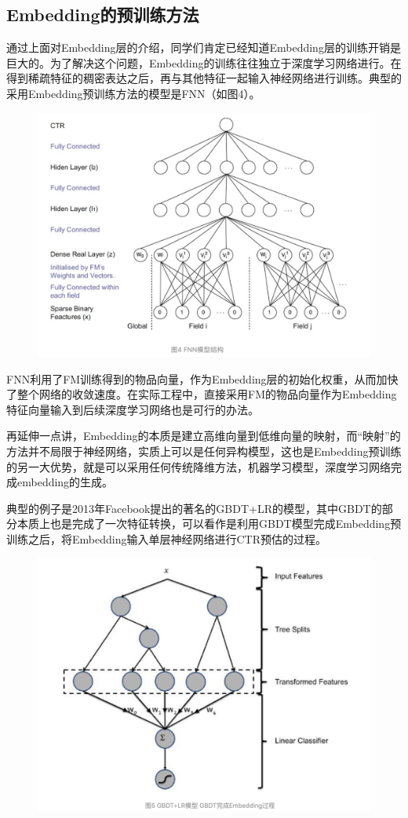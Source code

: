 \documentclass[12pt]{article}
\begin{document}
\subsection{Embedding的预训练方法}
通过上面对Embedding层的介绍，同学们肯定已经知道Embedding层的训练开销是巨大的。为了解决这个问题，Embedding的训练往往独立于深度学习网络进行。在得到稀疏特征的稠密表达之后，再与其他特征一起输入神经网络进行训练。典型的采用Embedding预训练方法的模型是FNN（如图4）。
\begin{figure}[H]
    \centering
    \includegraphics[width=.8\textwidth]{fig/FNN_Structure.png}
\end{figure}

FNN利用了FM训练得到的物品向量，作为Embedding层的初始化权重，从而加快了整个网络的收敛速度。在实际工程中，直接采用FM的物品向量作为Embedding特征向量输入到后续深度学习网络也是可行的办法。

再延伸一点讲，Embedding的本质是建立高维向量到低维向量的映射，而“映射”的方法并不局限于神经网络，实质上可以是任何异构模型，这也是Embedding预训练的另一大优势，就是可以采用任何传统降维方法，机器学习模型，深度学习网络完成embedding的生成。

典型的例子是2013年Facebook提出的著名的GBDT+LR的模型，其中GBDT的部分本质上也是完成了一次特征转换，可以看作是利用GBDT模型完成Embedding预训练之后，将Embedding输入单层神经网络进行CTR预估的过程。

\begin{figure}[H]
    \centering
    \includegraphics[width=1\textwidth]{fig/Embedding_GBDT_LR.png}
\end{figure}
\end{document}
